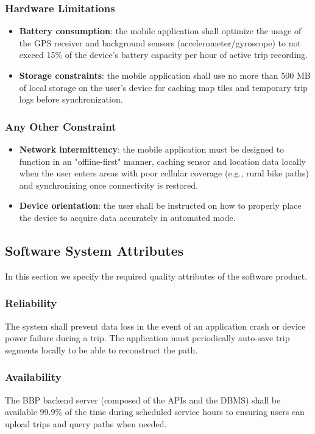 \documentclass{article}
\begin{document}
\subsubsection{Hardware Limitations}
\begin{itemize}
    \item \textbf{Battery consumption}: the mobile application shall optimize the usage of the GPS receiver and background sensors (accelerometer/gyroscope) to not exceed 15\% of the device's battery capacity per hour of active trip recording.
    \item \textbf{Storage constraints}: the mobile application shall use no more than 500 MB of local storage on the user's device for caching map tiles and temporary trip logs before synchronization.
\end{itemize}
\subsubsection{Any Other Constraint}
\begin{itemize}
    \item \textbf{Network intermittency}: the mobile application must be designed to function in an "offline-first" manner, caching sensor and location data locally when the user enters areas with poor cellular coverage (e.g., rural bike paths) and synchronizing once connectivity is restored.
    \item \textbf{Device orientation}: the user shall be instructed on how to properly place the device to acquire data accurately in automated mode.
\end{itemize}

\subsection{Software System Attributes}
In this section we specify the required quality attributes of the software product.
\subsubsection{Reliability}
The system shall prevent data loss in the event of an application crash or device power failure during a trip. The application must periodically auto-save trip segments locally to be able to reconstruct the path.
\subsubsection{Availability}
The BBP backend server (composed of the APIs and the DBMS) shall be available 99.9\% of the time during scheduled service hours to ensuring users can upload trips and query paths when needed.
\end{document}
